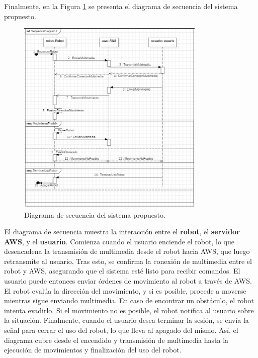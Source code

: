         Finalmente, en la Figura \ref{fig:Secuencia} se presenta el diagrama de secuencia del sistema propuesto.
        \vskip 0.5cm
            \begin{figure}[htbp]
                \centering
                \includegraphics[width=0.8\textwidth]{images/desarrollo/diagramas/Secuencia.jpeg}
                \caption{Diagrama de secuencia del sistema propuesto.}
                \label{fig:Secuencia}
            \end{figure}
        \vskip 0.5cm
        El diagrama de secuencia muestra la interacci\'on entre el \textbf{robot}, el \textbf{servidor AWS}, y el \textbf{usuario}. Comienza cuando 
        el usuario enciende el robot, lo que desencadena la transmisi\'on de multimedia desde el robot hacia AWS, que luego retransmite 
        al usuario. Tras esto, se confirma la conexi\'on de multimedia entre el robot y AWS, asegurando que el sistema est\'e listo para 
        recibir comandos.
        \vskip 0.5cm
        El usuario puede entonces enviar \'ordenes de movimiento al robot a trav\'es de AWS. El robot eval\'ua la direcci\'on del movimiento, 
        y si es posible, procede a moverse mientras sigue enviando multimedia. En caso de encontrar un obst\'aculo, el robot intenta 
        evadirlo. Si el movimiento no es posible, el robot notifica al usuario sobre la situaci\'on.
        \vskip 0.5cm
        Finalmente, cuando el usuario desea terminar la sesi\'on, se env\'ia la se\~nal para cerrar el uso del robot, lo que lleva al apagado 
        del mismo. As\'i, el diagrama cubre desde el encendido y transmisi\'on de multimedia hasta la ejecuci\'on de movimientos y finalizaci\'on 
        del uso del robot.
        \vskip 0.5cm
            